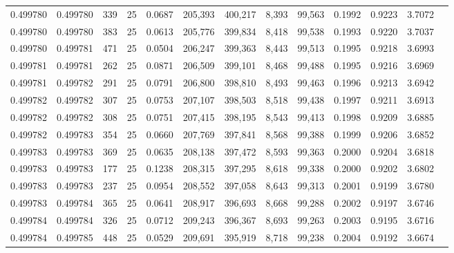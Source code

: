 \begin{tabular}{rrrrrrrrrrrrr}
0.499780 & 0.499780 &   339 &  25 &                                     0.0687 & 205,393 & 400,217 &   8,393 &  99,563 & 0.1992 & 0.9223 & 3.7072 \\
0.499780 & 0.499780 &   383 &  25 &                                     0.0613 & 205,776 & 399,834 &   8,418 &  99,538 & 0.1993 & 0.9220 & 3.7037 \\
0.499780 & 0.499781 &   471 &  25 &                                     0.0504 & 206,247 & 399,363 &   8,443 &  99,513 & 0.1995 & 0.9218 & 3.6993 \\
0.499781 & 0.499781 &   262 &  25 &                                     0.0871 & 206,509 & 399,101 &   8,468 &  99,488 & 0.1995 & 0.9216 & 3.6969 \\
0.499781 & 0.499782 &   291 &  25 &                                     0.0791 & 206,800 & 398,810 &   8,493 &  99,463 & 0.1996 & 0.9213 & 3.6942 \\
0.499782 & 0.499782 &   307 &  25 &                                     0.0753 & 207,107 & 398,503 &   8,518 &  99,438 & 0.1997 & 0.9211 & 3.6913 \\
0.499782 & 0.499782 &   308 &  25 &                                     0.0751 & 207,415 & 398,195 &   8,543 &  99,413 & 0.1998 & 0.9209 & 3.6885 \\
0.499782 & 0.499783 &   354 &  25 &                                     0.0660 & 207,769 & 397,841 &   8,568 &  99,388 & 0.1999 & 0.9206 & 3.6852 \\
0.499783 & 0.499783 &   369 &  25 &                                     0.0635 & 208,138 & 397,472 &   8,593 &  99,363 & 0.2000 & 0.9204 & 3.6818 \\
0.499783 & 0.499783 &   177 &  25 &                                     0.1238 & 208,315 & 397,295 &   8,618 &  99,338 & 0.2000 & 0.9202 & 3.6802 \\
0.499783 & 0.499783 &   237 &  25 &                                     0.0954 & 208,552 & 397,058 &   8,643 &  99,313 & 0.2001 & 0.9199 & 3.6780 \\
0.499783 & 0.499784 &   365 &  25 &                                     0.0641 & 208,917 & 396,693 &   8,668 &  99,288 & 0.2002 & 0.9197 & 3.6746 \\
0.499784 & 0.499784 &   326 &  25 &                                     0.0712 & 209,243 & 396,367 &   8,693 &  99,263 & 0.2003 & 0.9195 & 3.6716 \\
0.499784 & 0.499785 &   448 &  25 &                                     0.0529 & 209,691 & 395,919 &   8,718 &  99,238 & 0.2004 & 0.9192 & 3.6674 \\

\end{tabular}
